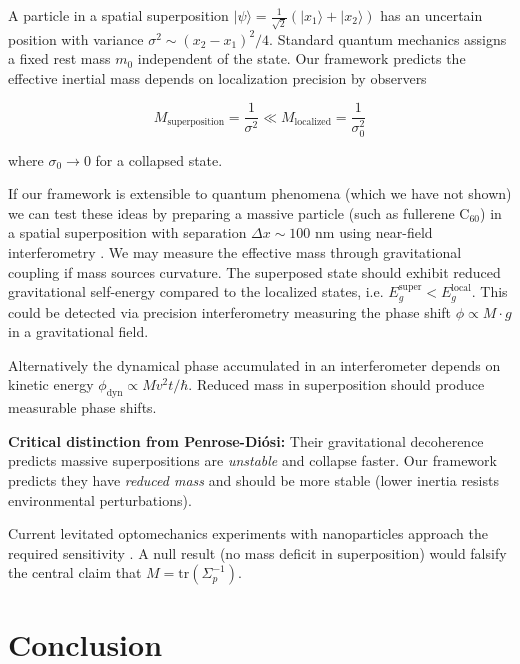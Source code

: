 \documentclass[11pt]{article}
\begin{document}
A particle in a spatial superposition $|\psi\rangle = \frac{1}{\sqrt{2}}(|x_1\rangle + |x_2\rangle)$ has an uncertain position with variance $\sigma^2 \sim (x_2-x_1)^2/4$. Standard quantum mechanics assigns a fixed rest mass $m_0$ independent of the state. Our framework predicts the effective inertial mass depends on localization precision by observers

\begin{equation}
M_{\text{superposition}} = \frac{1}{\sigma^2} \ll M_{\text{localized}} = \frac{1}{\sigma_0^2}
\end{equation}

where $\sigma_0 \to 0$ for a collapsed state.

If our framework is extensible to quantum phenomena (which we have not shown) we can test these ideas by preparing a massive particle (such as fullerene C$_{60}$) in a spatial superposition with separation $\Delta x \sim 100$ nm using near-field interferometry \cite{Arndt2014}. We may measure the effective mass through gravitational coupling if mass sources curvature. The superposed state should exhibit reduced gravitational self-energy compared to the localized states, i.e.  
$E_g^{\text{super}} < E_g^{\text{local}}$. This could be detected via precision interferometry measuring the phase shift $\phi \propto M \cdot g$ in a gravitational field.

Alternatively the dynamical phase accumulated in an interferometer depends on kinetic energy $\phi_{\text{dyn}} \propto M v^2 t/\hbar$. Reduced mass in superposition should produce measurable phase shifts.

\textbf{Critical distinction from Penrose-Diósi:} Their gravitational decoherence predicts massive superpositions are \emph{unstable} and collapse faster. Our framework predicts they have \emph{reduced mass} and should be more stable (lower inertia resists environmental perturbations). 

Current levitated optomechanics experiments with nanoparticles approach the required sensitivity \cite{Bateman2014, Millen2020}. A null result (no mass deficit in superposition) would falsify the central claim that $M = \mathrm{tr}(\Sigma_p^{-1})$.




\section{Conclusion}
\label{sec:conclusion}
\end{document}

